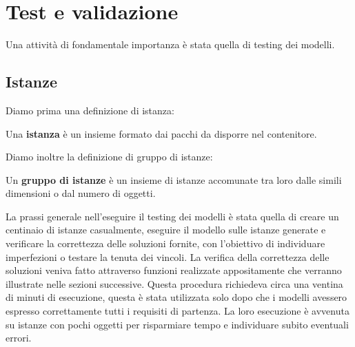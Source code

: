 
\hypertarget{(chap:capitolo5)}{}
\chapter{Test e validazione}
Una attività di fondamentale importanza è stata quella di testing dei modelli.
\section{Istanze}
Diamo prima una definizione di istanza:
\begin{center}
	Una \textbf{istanza} è un insieme formato dai pacchi da disporre nel contenitore.
\end{center}
Diamo inoltre la definizione di gruppo di istanze:
\begin{center}
	Un \textbf{gruppo di istanze} è un insieme di istanze accomunate tra loro dalle simili dimensioni o dal numero di oggetti.
\end{center}
La prassi generale nell'eseguire il testing dei modelli è stata quella di creare un centinaio di istanze casualmente, eseguire il modello sulle istanze generate e verificare la correttezza delle soluzioni fornite, con l'obiettivo di individuare imperfezioni o testare la tenuta dei vincoli.
La verifica della correttezza delle soluzioni veniva fatto attraverso funzioni realizzate appositamente che verranno illustrate nelle sezioni successive.
Questa procedura richiedeva circa una ventina di minuti di esecuzione, questa è stata utilizzata solo dopo che i modelli avessero espresso correttamente tutti i requisiti di partenza. La loro esecuzione è avvenuta su istanze con pochi oggetti per risparmiare tempo e individuare subito eventuali errori.


